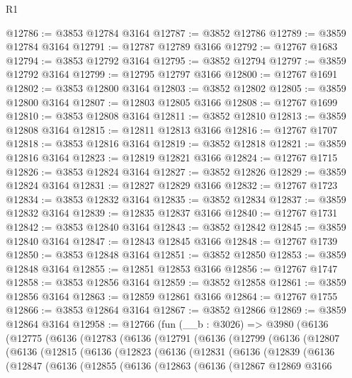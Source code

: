 \begin{lexlean}{R1}
\begin{coremodule}
@12786 := @3853 @12784 @3164
@12787 := @3852 @12786
@12789 := @3859 @12784 @3164
@12791 := @12787 @12789 @3166
@12792 := @12767 @1683
@12794 := @3853 @12792 @3164
@12795 := @3852 @12794
@12797 := @3859 @12792 @3164
@12799 := @12795 @12797 @3166
@12800 := @12767 @1691
@12802 := @3853 @12800 @3164
@12803 := @3852 @12802
@12805 := @3859 @12800 @3164
@12807 := @12803 @12805 @3166
@12808 := @12767 @1699
@12810 := @3853 @12808 @3164
@12811 := @3852 @12810
@12813 := @3859 @12808 @3164
@12815 := @12811 @12813 @3166
@12816 := @12767 @1707
@12818 := @3853 @12816 @3164
@12819 := @3852 @12818
@12821 := @3859 @12816 @3164
@12823 := @12819 @12821 @3166
@12824 := @12767 @1715
@12826 := @3853 @12824 @3164
@12827 := @3852 @12826
@12829 := @3859 @12824 @3164
@12831 := @12827 @12829 @3166
@12832 := @12767 @1723
@12834 := @3853 @12832 @3164
@12835 := @3852 @12834
@12837 := @3859 @12832 @3164
@12839 := @12835 @12837 @3166
@12840 := @12767 @1731
@12842 := @3853 @12840 @3164
@12843 := @3852 @12842
@12845 := @3859 @12840 @3164
@12847 := @12843 @12845 @3166
@12848 := @12767 @1739
@12850 := @3853 @12848 @3164
@12851 := @3852 @12850
@12853 := @3859 @12848 @3164
@12855 := @12851 @12853 @3166
@12856 := @12767 @1747
@12858 := @3853 @12856 @3164
@12859 := @3852 @12858
@12861 := @3859 @12856 @3164
@12863 := @12859 @12861 @3166
@12864 := @12767 @1755
@12866 := @3853 @12864 @3164
@12867 := @3852 @12866
@12869 := @3859 @12864 @3164
@12958 := @12766
    (fun (__b : @3026) =>
    @3980
      (@6136
        (@12775
          (@6136
            (@12783
              (@6136
                (@12791
                  (@6136
                    (@12799
                      (@6136
                        (@12807
                          (@6136
                            (@12815
                              (@6136
                                (@12823
                                  (@6136
                                    (@12831
                                      (@6136
                                        (@12839
                                          (@6136
                                            (@12847
                                              (@6136
                                                (@12855
                                                  (@6136
                                                    (@12863
                                                      (@6136
                                                        (@12867
                                                          @12869
                                                          @3166

\end{coremodule}
\end{lexlean}
